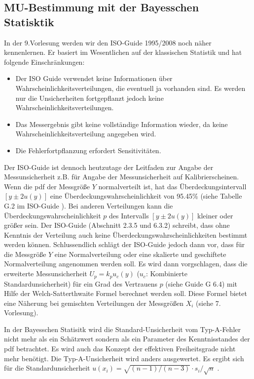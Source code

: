 \subsection{MU-Bestimmung mit der Bayesschen Statisktik}
In der 9.Vorlesung werden wir den ISO-Guide 1995/2008 \cite{GUM95} noch näher kennenlernen. Er basiert im Wesentlichen auf der klassischen Statistik und hat
folgende Einschränkungen:
\begin{itemize}\item Der ISO Guide verwendet keine Informationen über
	Wahrscheinlichkeitsverteilungen, die eventuell ja vorhanden
	sind. Es werden nur die Unsicherheiten fortgepflanzt jedoch keine Wahrscheinlichkeitsverteilungen.
	\item Das Messergebnis gibt keine vollständige Information wieder, da keine Wahrscheinlichkeitsverteilung angegeben wird.
	\item Die Fehlerfortpflanzung erfordert Sensitivitäten.
\end{itemize}
Der ISO-Guide ist dennoch heutzutage der Leitfaden zur Angabe der
Messunsicherheit z.B. für Angabe der Messunsicherheit auf Kalibrierscheinen.
Wenn die pdf der Messgröße $Y$ normalverteilt ist, hat das Überdeckungsintervall
$[y\pm 2 u(y)]$ eine Überdeckungswahrscheinlichkeit von 95.45\% (siehe Tabelle G.2 im ISO-Guide \cite{GUM95}).
Bei anderen Verteilungen kann die Überdeckungswahrscheinlichkeit $p$ des Intervalls $[y \pm 2 u(y)]$ kleiner oder
größer sein. Der ISO-Guide (Abschnitt 2.3.5 und 6.3.2) schreibt, dass ohne
Kenntnis der Verteilung auch keine Überdeckungswahrscheinlichkeiten bestimmt werden können. Schlussendlich schlägt der ISO-Guide jedoch dann vor, dass für die
Messgröße $Y$ eine Normalverteilung oder eine skalierte und
geschiftete Normalverteilung angenommen werden soll.
Es wird dann vorgschlagen, dass die erweiterte Messunsicherheit
$U_p=k_p u_c(y)$ ($u_c$: Kombinierte Standardunsicherheit) für ein Grad des Vertrauens $p$ (siehe Guide G 6.4) mit
Hilfe der Welch-Satterthwaite Formel berechnet werden soll. Diese Formel
bietet eine Näherung bei gemischten Verteilungen der Messgrößen $X_i$
(siehe 7. Vorlesung).

In der Bayesschen Statisitk wird die Standard-Unsicherheit vom Typ-A-Fehler nicht mehr als ein Schätzwert sondern als ein Parameter des Kenntnisstandes der pdf betrachtet.
Es wird auch das Konzept der effektiven Freiheitsgrade nicht mehr benötigt.
Die Typ-A-Unsicherheit wird anders ausgewertet. Es ergibt sich für die Standardunsicherheit $u(x_i) = \sqrt{(n-1)/(n-3)} \cdot s_i/\sqrt{n}$ \cite{Kac03}.


